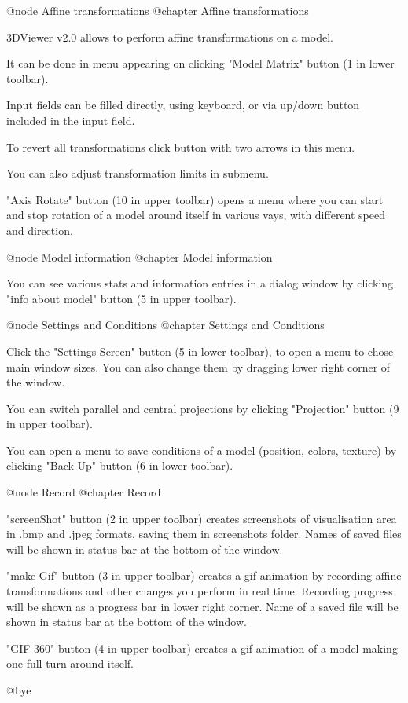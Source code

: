 @node Affine transformations
@chapter Affine transformations

3DViewer v2.0 allows to perform affine transformations on a model.

It can be done in menu appearing on clicking "Model Matrix" button (1 in lower toolbar).

Input fields can be filled directly, using keyboard, or via up/down button included in the input field.

To revert all transformations click button with two arrows in this menu.

You can also adjust transformation limits in submenu.

"Axis Rotate" button (10 in upper toolbar) opens a menu where you can start and stop rotation of a model around itself in various vays, with different speed and direction.

@node Model information
@chapter Model information

You can see various stats and information entries in a dialog window by clicking "info about model" button (5 in upper toolbar).

@node Settings and Conditions
@chapter Settings and Conditions

Click the "Settings Screen" button (5 in lower toolbar), to open a menu to chose main window sizes. You can also change them by dragging lower right corner of the window.

You can switch parallel and central projections by clicking "Projection" button (9 in upper toolbar).

You can open a menu to save conditions of a model (position, colors, texture) by clicking "Back Up" button (6 in lower toolbar).

@node Record
@chapter Record

"screenShot" button (2 in upper toolbar) creates screenshots of visualisation area in .bmp and .jpeg formats, saving them in screenshots folder. Names of saved files will be shown in status bar at the bottom of the window.

"make Gif" button (3 in upper toolbar) creates a gif-animation by recording affine transformations and other changes you perform in real time. Recording progress will be shown as a progress bar in lower right corner. Name of a saved file will be shown in status bar at the bottom of the window.

"GIF 360" button (4 in upper toolbar) creates a gif-animation of a model making one full turn around itself.

@bye